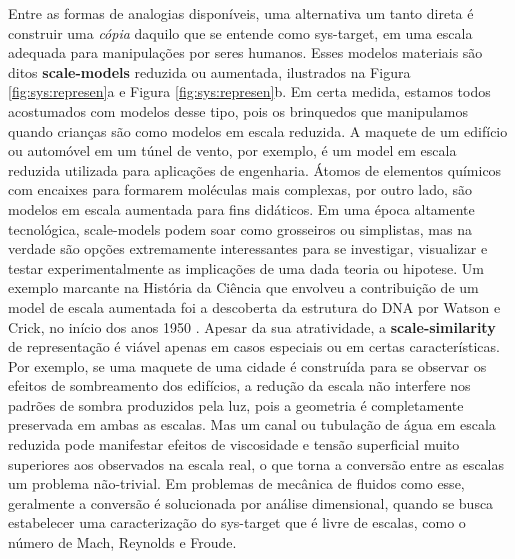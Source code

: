 \documentclass[./main.tex]{subfiles}
\begin{document}
\par Entre as formas de analogias disponíveis, uma alternativa um tanto direta é construir uma \textit{cópia} daquilo que se entende como \gls{sys-target}, em uma escala adequada para manipulações por seres humanos. Esses modelos materiais são ditos \textbf{\gls{scale-models}} reduzida ou aumentada, ilustrados na Figura \ref{fig:sys:represen}a e Figura \ref{fig:sys:represen}b. Em certa medida, estamos todos acostumados com modelos desse tipo, pois os brinquedos que manipulamos quando crianças são como modelos em escala reduzida. A maquete de um edifício ou automóvel em um túnel de vento, por exemplo, é um \gls{model} em escala reduzida utilizada para aplicações de engenharia. Átomos de elementos químicos com encaixes para formarem moléculas mais complexas, por outro lado, são modelos em escala aumentada para fins didáticos. Em uma época altamente tecnológica, \gls{scale-models} podem soar como grosseiros ou simplistas, mas na verdade são opções extremamente interessantes para se investigar, visualizar e testar experimentalmente as implicações de uma dada \gls{teoria} ou \gls{hipotese}. Um exemplo marcante na História da Ciência que envolveu a contribuição de um \gls{model} de escala aumentada foi a descoberta da estrutura do DNA por Watson e Crick, no início dos anos 1950 \cite{deChadarevian2003}. Apesar da sua atratividade, a \textbf{\gls{scale-similarity}} de representação é viável apenas em casos especiais ou em certas características. Por exemplo, se uma maquete de uma cidade é construída para se observar os efeitos de sombreamento dos edifícios, a redução da escala não interfere nos padrões de sombra produzidos pela luz, pois a geometria é completamente preservada em ambas as escalas. Mas um canal ou tubulação de água em escala reduzida pode manifestar efeitos de viscosidade e tensão superficial muito superiores aos observados na escala real, o que torna a conversão entre as escalas um problema não-trivial. Em problemas de mecânica de fluidos como esse, geralmente a conversão é solucionada por análise dimensional, quando se busca estabelecer uma caracterização do \gls{sys-target} que é livre de escalas, como o número de Mach, Reynolds e Froude.
\end{document}
